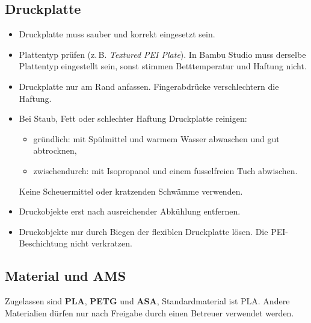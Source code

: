 \documentclass{\basedir/fablab-document}
\begin{document}
	\subsection{Druckplatte}
	
	\begin{itemize}
		\item Druckplatte muss sauber und korrekt eingesetzt sein.
		\item Plattentyp prüfen (z.\,B. \textit{Textured PEI Plate}). In Bambu Studio muss derselbe Plattentyp eingestellt sein, sonst stimmen Betttemperatur und Haftung nicht.
		\item Druckplatte nur am Rand anfassen. Fingerabdrücke verschlechtern die Haftung.
		\item Bei Staub, Fett oder schlechter Haftung Druckplatte reinigen:
		\begin{itemize}
			\item gründlich: mit Spülmittel und warmem Wasser abwaschen und gut abtrocknen,
			\item zwischendurch: mit Isopropanol und einem fusselfreien Tuch abwischen.
		\end{itemize}
		Keine Scheuermittel oder kratzenden Schwämme verwenden.
		\item Druckobjekte erst nach ausreichender Abkühlung entfernen.
		\item Druckobjekte nur durch Biegen der flexiblen Druckplatte lösen. Die PEI-Beschichtung nicht verkratzen.
	\end{itemize}
	
	\newpage
	\subsection{Material und AMS}
	
	Zugelassen sind \textbf{PLA}, \textbf{PETG} und \textbf{ASA}, Standardmaterial ist PLA. Andere Materialien dürfen nur nach Freigabe durch einen Betreuer verwendet werden.
	
\end{document}
